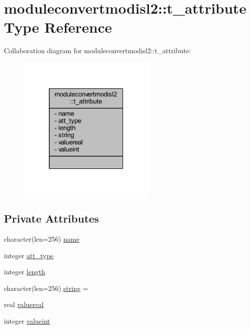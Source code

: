 \hypertarget{structmoduleconvertmodisl2_1_1t__attribute}{}\section{moduleconvertmodisl2\+:\+:t\+\_\+attribute Type Reference}
\label{structmoduleconvertmodisl2_1_1t__attribute}


Collaboration diagram for moduleconvertmodisl2\+:\+:t\+\_\+attribute\+:\nopagebreak
\begin{figure}[H]
\begin{center}
\leavevmode
\includegraphics[width=193pt]{structmoduleconvertmodisl2_1_1t__attribute__coll__graph}
\end{center}
\end{figure}
\subsection*{Private Attributes}
\begin{DoxyCompactItemize}
\item 
character(len=256) \mbox{\hyperlink{structmoduleconvertmodisl2_1_1t__attribute_a7fc4ccd6ffefd3b106ef23b53fd77262}{name}}
\item 
integer \mbox{\hyperlink{structmoduleconvertmodisl2_1_1t__attribute_ad0fe0e50ce739cf7ab588598b6f9da57}{att\+\_\+type}}
\item 
integer \mbox{\hyperlink{structmoduleconvertmodisl2_1_1t__attribute_a8547841634b4827b4711b40c2e4feeb8}{length}}
\item 
character(len=256) \mbox{\hyperlink{structmoduleconvertmodisl2_1_1t__attribute_ae6bf433f7256b9ebfe12d8e0e90bec8e}{string}} = \textquotesingle{} \textquotesingle{}
\item 
real \mbox{\hyperlink{structmoduleconvertmodisl2_1_1t__attribute_a94ebc3842417ddb9880fc70d581204d2}{valuereal}}
\item 
integer \mbox{\hyperlink{structmoduleconvertmodisl2_1_1t__attribute_a696e0a9c15007240789e7345e45800b0}{valueint}}
\end{DoxyCompactItemize}


